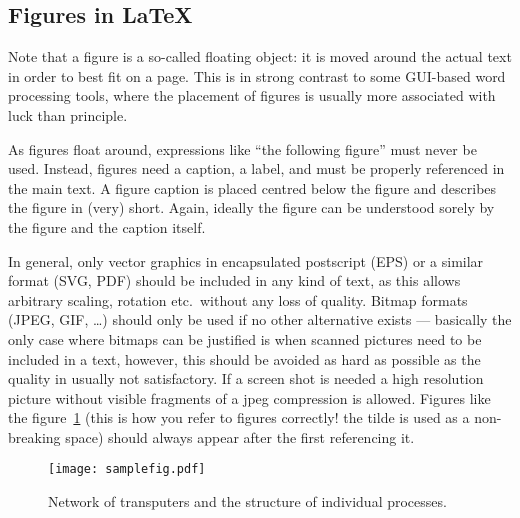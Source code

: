 \subsection{Figures in \LaTeX}
\label{sec:model:subsec:figures}
Note that a figure is a so-called floating object: it is moved around the actual text in order to best fit on a page. This is in strong contrast to some GUI-based word processing tools, where the placement of figures is usually more associated with luck than principle.

As figures float around, expressions like ``the following figure'' must never be used. Instead, figures need a caption, a label, and must be properly referenced in the main text. A figure caption is placed centred below the figure and describes the figure in (very) short. Again, ideally the figure can be understood sorely by the figure and the caption itself.

In general, only vector graphics in encapsulated postscript (EPS) or a similar format (SVG, PDF) should be included in any kind of text, as this allows arbitrary scaling, rotation etc.\ without any loss of quality. Bitmap formats (JPEG, GIF, \dots) should only be used if no other alternative exists --- basically the only case where bitmaps can be justified is when scanned pictures need to be included in a text, however, this should be avoided as hard as possible as the quality in usually not satisfactory. If a screen shot is needed a high resolution picture without visible fragments of a jpeg compression is allowed. Figures like the figure~\ref{fig:samplefig} (this is how you refer to figures correctly! the tilde is used as a non-breaking space) should always appear after the first referencing it.
\begin{figure}[hbtp]
	 \centerline{\texttt{[image: samplefig.pdf]}}
	 {\caption{Network of transputers and the structure of individual
processes.}\label{fig:samplefig}}
\end{figure}